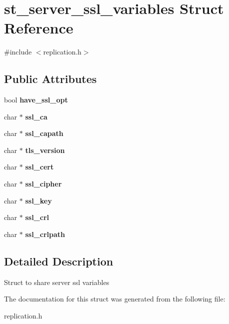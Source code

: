 \hypertarget{structst__server__ssl__variables}{}\section{st\+\_\+server\+\_\+ssl\+\_\+variables Struct Reference}
\label{structst__server__ssl__variables}


{\ttfamily \#include $<$replication.\+h$>$}

\subsection*{Public Attributes}
\begin{DoxyCompactItemize}
\item 
\mbox{\label{structst__server__ssl__variables_aa0e547b2429b0fb282901fbd15e975a0}} 
bool {\bfseries have\+\_\+ssl\+\_\+opt}
\item 
\mbox{\label{structst__server__ssl__variables_ad0a956cf4e3d11cae1a379111e3ee805}} 
char $\ast$ {\bfseries ssl\+\_\+ca}
\item 
\mbox{\label{structst__server__ssl__variables_ab2eb2cae32eb1796fd49db90b7fef637}} 
char $\ast$ {\bfseries ssl\+\_\+capath}
\item 
\mbox{\label{structst__server__ssl__variables_a93d336a1f6851234b8db02ab6de5db0b}} 
char $\ast$ {\bfseries tls\+\_\+version}
\item 
\mbox{\label{structst__server__ssl__variables_a66a0c48d6e06e4fd51a3ced07a0219ef}} 
char $\ast$ {\bfseries ssl\+\_\+cert}
\item 
\mbox{\label{structst__server__ssl__variables_ad5d3c778a586f117c78cb5ce90100417}} 
char $\ast$ {\bfseries ssl\+\_\+cipher}
\item 
\mbox{\label{structst__server__ssl__variables_a85151ad2a8830157c11414e43a7d78dc}} 
char $\ast$ {\bfseries ssl\+\_\+key}
\item 
\mbox{\label{structst__server__ssl__variables_a016ede81217b78b77c59bf1e7a5e4502}} 
char $\ast$ {\bfseries ssl\+\_\+crl}
\item 
\mbox{\label{structst__server__ssl__variables_afebbbf567fc94ae11164dbc7ec563719}} 
char $\ast$ {\bfseries ssl\+\_\+crlpath}
\end{DoxyCompactItemize}


\subsection{Detailed Description}
Struct to share server ssl variables 

The documentation for this struct was generated from the following file\+:\begin{DoxyCompactItemize}
\item 
replication.\+h\end{DoxyCompactItemize}
